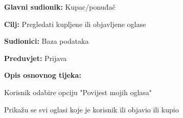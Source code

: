 					\noindent {}
					\begin{packed_item}
						
						\item \textbf{Glavni sudionik: } Kupac/ponuđač
						\item  \textbf{Cilj:} Pregledati kupljene ili objavljene oglase
						\item  \textbf{Sudionici:} Baza podataka
						\item  \textbf{Preduvjet:} Prijava 
						
						\item  \textbf{Opis osnovnog tijeka:} 
						
						\item[] \begin{packed_enum}
							
							\item Korisnik odabire opciju "Povijest mojih oglasa"
							
							\item Prikažu se svi oglasi koje je korisnik ili objavio ili kupio
							
							
						\end{packed_enum}
						
						
					\end{packed_item}
					
					
					
